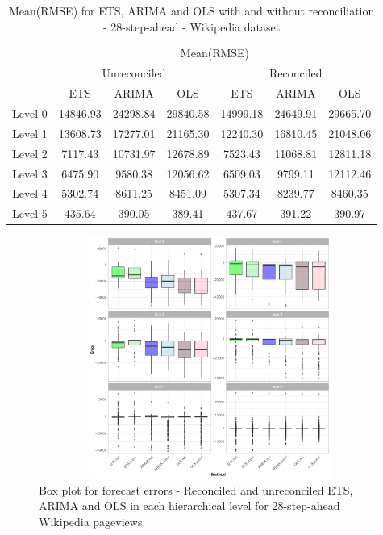 \documentclass[11pt,a4paper,]{article}
\begin{document}
\begin{table}[t]

\caption{\label{tab:wikipediadataresultRMSE}Mean(RMSE) for ETS, ARIMA and OLS with and without reconciliation - 28-step-ahead - Wikipedia dataset}
\centering
\begin{tabular}{ccccccc}
\toprule
\multicolumn{1}{c}{} & \multicolumn{6}{c}{Mean(RMSE)} \\
\cmidrule(l{3pt}r{3pt}){2-7}
\multicolumn{1}{c}{} & \multicolumn{3}{c}{Unreconciled} & \multicolumn{3}{c}{Reconciled} \\
\cmidrule(l{3pt}r{3pt}){2-4} \cmidrule(l{3pt}r{3pt}){5-7}
 & ETS & ARIMA & OLS & ETS & ARIMA & OLS\\
\midrule
Level 0 & 14846.93 & 24298.84 & 29840.58 & 14999.18 & 24649.91 & 29665.70\\
Level 1 & 13608.73 & 17277.01 & 21165.30 & 12240.30 & 16810.45 & 21048.06\\
Level 2 & 7117.43 & 10731.97 & 12678.89 & 7523.43 & 11068.81 & 12811.18\\
Level 3 & 6475.90 & 9580.38 & 12056.62 & 6509.03 & 9799.11 & 12112.46\\
Level 4 & 5302.74 & 8611.25 & 8451.09 & 5307.34 & 8239.77 & 8460.35\\
Level 5 & 435.64 & 390.05 & 389.41 & 437.67 & 391.22 & 390.97\\
\bottomrule
\end{tabular}
\end{table}

\begin{figure}

{\centering \includegraphics[width=450px,height=300px]{Paper-Figures/results_Wikipedia/boxplot_28} 

}

\caption{Box plot for forecast errors -  Reconciled and unreconciled ETS, ARIMA and OLS in each hierarchical level for 28-step-ahead Wikipedia pageviews}\label{fig:boxplotwiki}
\end{figure}
\end{document}
